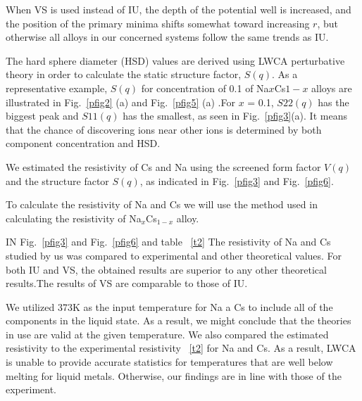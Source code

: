 \documentclass[final,12pt]{elsarticle}
\begin{document}
When VS is used instead of IU, the depth of the potential well is increased, and the position of the primary minima shifts somewhat toward increasing $r$, but otherwise all alloys in our concerned systems follow the same trends as IU.  

The hard sphere diameter (HSD) values are derived using LWCA perturbative theory in order to calculate the static structure factor, $S(q)$.
As a representative example, $S(q)$ for concentration of 0.1 of Na$ x$Cs$ 1-x$ alloys are illustrated in Fig.~\ref{pfig2} (a) and Fig.~\ref{pfig5} (a) .For $x$ = 0.1, $S 22(q)$ has the biggest peak and $S 11(q)$ has the smallest, as seen in Fig.~\ref{pfig3}(a). It means that the chance of discovering ions near other ions is determined by both component concentration and HSD.
  
We estimated the resistivity of Cs and Na using the screened form factor $V(q)$ and the structure factor $S(q)$, as indicated in Fig.~\ref{pfig3} and Fig.~\ref{pfig6}.

To calculate the resistivity of Na and Cs we will use the method used in calculating the resistivity of Na$_x$Cs$_{1-x}$ alloy.

IN Fig.~\ref{pfig3} and Fig.~\ref{pfig6} and table ~\ref{t2} The resistivity of Na and Cs studied by us was compared to experimental and other theoretical values. For both IU and VS, the obtained results are superior to any other theoretical results.The results of VS are comparable to those of IU. 

We utilized 373K as the input temperature for Na a Cs to include all of the components in the liquid state.
As a result, we might conclude that the theories in use are valid at the given temperature.
We also compared the estimated resistivity to the experimental resistivity ~\ref{t2} for Na and Cs. As a result, LWCA is unable to provide accurate statistics for temperatures that are well below melting for liquid metals.
Otherwise, our findings are in line with those of the experiment. 
\end{document}
